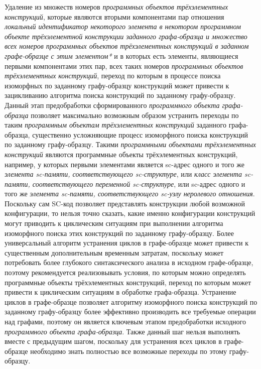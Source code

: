 \begin{textitemize}
	\item Удаление из множеств номеров \textit{программных объектов трёхэлементных конструкций}, которые являются вторыми компонентами пар отношения \textit{локальный идентификатор некоторого элемента в некотором программном объекте трёхэлементной конструкции заданного графа-образца и множество всех номеров программных объектов трёхэлементных конструкций в заданном графе-образце с этим элементом*} и в которых есть элементы, являющиеся первыми компонентами этих пар, всех таких номеров \textit{программных объектов трёхэлементных конструкций}, переход по которым в процессе поиска изоморфных по заданному графу-образцу конструкций может привести к зацикливанию алгоритма поиска конструкций по заданному графу-образцу. Данный этап предобработки сформированного \textit{программного объекта графа-образца} позволяет максимально возможным образом устранить переходы по таким \textit{программным объектам трёхэлементных конструкций} заданного графа-образца, существенно усложняющие процесс изоморфного поиска конструкций по заданному графу-образцу. Такими \textit{программными объектами трёхэлементных конструкций} являются программные объекты трёхэлементных конструкций, например, у которых первыми элементами является sc-адрес одного и того же \textit{элемента sc-памяти, соответствующего sc-структуре}, или \textit{класс элемента sc-памяти, соответствующего переменной sc-структуре}, или sc-адрес одного и того же \textit{элемента sc-памяти, соответствующего sc-узлу неролевого отношения}. Поскольку сам SC-код позволяет представлять конструкции любой возможной конфигурации, то нельзя точно сказать, какие именно конфигурации конструкций могут приводить к циклическим ситуациям при выполнении алгоритма изоморфного поиска этих конструкций по заданному графу-образцу. Более универсальный алгоритм устранения циклов в графе-образце может привести к существенным дополнительным временным затратам, поскольку может потребовать более глубокого синтаксического анализа в исходном графе-образце, поэтому рекомендуется реализовывать условия, по которым можно определять программные объекты трёхэлементных конструкций, переход по которым может привести к циклическим ситуациям в обработке графа-образца. Устранение циклов в графе-образце позволяет алгоритму изоморфного поиска конструкций по заданному графу-образцу более эффективно производить все требуемые операции над графами, поэтому он является ключевым этапом предобработки исходного \textit{программного объекта графа-образца}. Также данный шаг нельзя выполнять вместе с предыдущим шагом, поскольку для устранения всех циклов в графе-образце необходимо знать полностью все возможные переходы по этому графу-образцу.

\end{textitemize}
